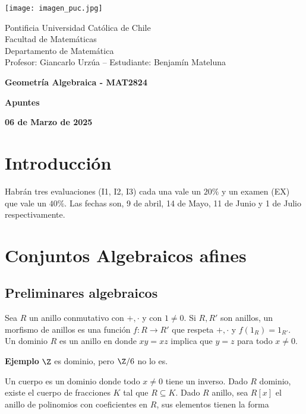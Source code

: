 \documentclass{article}
\begin{document}
\begin{minipage}{2.5cm}
    \texttt{[image: imagen\_puc.jpg]}
\end{minipage}
\begin{minipage}{14cm}
    {\sc Pontificia Universidad Católica de Chile\\
    Facultad de Matemáticas\\
    Departamento de Matemática\\
    Profesor: Giancarlo Urzúa -- Estudiante: Benjamín Mateluna}
\end{minipage}
\vspace{1ex}

{\centerline{\bf Geometría Algebraica - MAT2824}
\centerline{\bf Apuntes}}
\centerline{\bf 06 de Marzo de 2025}

\newpage
\tableofcontents

\newpage
\section*{Introducción}
{}

\noindent Habrán tres evaluaciones (I1, I2, I3) cada una vale un $20\%$ y un examen (EX) que vale 
un $40\%$. Las fechas son, 9 de abril, 14 de Mayo, 11 de Junio y 1 de Julio respectivamente.

\newpage
\section{Conjuntos Algebraicos afines}
\subsection{Preliminares algebraicos}
\noindent Sea $R$ un anillo conmutativo con $+,\cdot$ y con $1\neq0$. Si $R,R'$ son anillos, un 
morfismo de anillos es una función $f:R\to R'$ que respeta $+,\cdot$ y $f(1_{R})=1_{R'}$. Un 
dominio $R$ es un anillo en donde $xy=xz$ implica que $y=z$ para todo $x\neq0$.
\vspace{4mm}

\noindent\textbf{Ejemplo} $\Z$ es dominio, pero $\Z/6$ no lo es.
\vspace{4mm}

\noindent Un cuerpo es un dominio donde todo $x\neq0$ tiene un inverso. Dado $R$ dominio, existe el
cuerpo de fracciones $K$ tal que $R\subseteq K$. Dado $R$ anillo, sea $R[x]$ el anillo de 
polinomios con coeficientes en $R$, sus elementos tienen la forma
\end{document}
